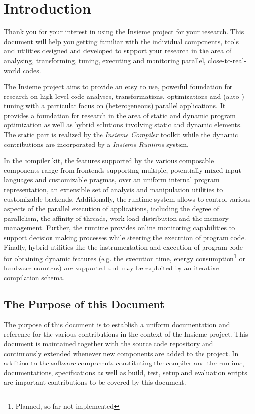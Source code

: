 \chapter{Introduction} \label{cap:introduction}

Thank you for your interest in using the Insieme \cite{insieme} project for your
research. This document will help you getting familiar with the individual
components, tools and utilities designed and developed to support your research
in the area of analysing, transforming, tuning, executing and monitoring
parallel, close-to-real-world codes.


The Insieme project aims to provide an easy to use, powerful foundation for
research on high-level code analyses, transformations, optimizations and (auto-)
tuning with a particular focus on (heterogeneous) parallel applications.
It provides a foundation for research in the area of static and dynamic
program optimization as well as hybrid solutions involving static and
dynamic elements. The static part is realized by the \textit{Insieme Compiler}
toolkit while the dynamic contributions are incorporated by a
\textit{Insieme Runtime} system.   

 
In the compiler kit, the features supported by the various composable components
range from frontends supporting multiple, potentially mixed input languages and
customizable pragmas, over an uniform internal program representation, an
extensible set of analysis and manipulation utilities to customizable backends.
Additionally, the runtime system allows to control various aspects of the
parallel execution of applications, including the degree of parallelism, the
affinity of threads, work-load distribution and the memory management. Further,
the runtime provides online monitoring capabilities to support decision making
processes while steering the execution of program code. Finally, hybrid
utilities like the instrumentation and execution of program code for obtaining
dynamic features (e.g. the execution time, energy consumption\footnote{Planned,
so far not implemented} or hardware counters) are supported and may be
exploited by an iterative compilation schema.

\section{The Purpose of this Document}
The purpose of this document is to establish a uniform documentation and
reference for the various contributions in the context of the Insieme project.
This document is maintained together with the source code repository and
continuously extended whenever new components are added to the project. In
addition to the software components constituting the compiler and the runtime,
documentations, specifications as well as build, test, setup and evaluation
scripts are important contributions to be covered by this
document.


